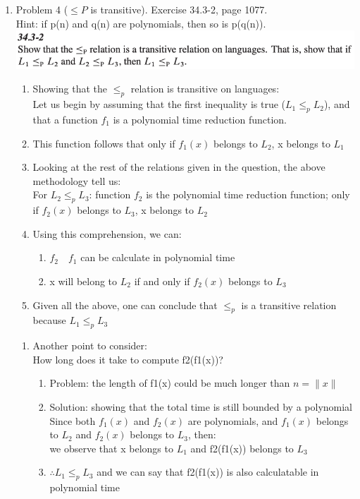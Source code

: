 \documentclass[11pt]{article}
\newcommand{\circo}{~\raisebox{1pt}{\tikz \draw[line width=0.6pt] circle(1.1pt);}~}
\begin{document}
\begin{enumerate}
\item Problem 4 ($\leq P$ is transitive). Exercise 34.3-2, page 1077. \\Hint: if p(n) and q(n) are polynomials, then so is p(q(n)).\\
\includegraphics[scale=1]{HW5_Q4.png}
    \begin{enumerate}
        \item Showing that the $\leq_p$ relation is transitive on languages:\\
        Let us begin by assuming that the first inequality is true ($L_1 \leq_p L_2$), and that a function $f_1$ is a polynomial time reduction function.
        \item This function follows that only if $f_1(x)$ belongs to $L_2$,  x belongs to $L_1$
        \item Looking at the rest of the relations given in the question, the above methodology tell us:\\
        For $L_2 \leq_p L_3$: function $f_2$ is the polynomial time reduction function; only if $f_2(x)$ belongs to $L_3$,  x belongs to $L_2$
        \item Using this comprehension, we can:
            \begin{enumerate}
                \item $f_2$\circo $f_1$  can be calculate in polynomial time
                \item x will belong to $L_2$ if and only if $f_2(x)$ belongs to $L_3$
            \end{enumerate}
        \item Given all the above, one can conclude that $\leq_p$ is a transitive relation because $L_1 \leq_p L_3$\\
    \end{enumerate}
    \begin{enumerate}
        \item Another point to consider:\\
        How long does it take to compute f2(f1(x))?
        \begin{enumerate}
            \item Problem: the length of f1(x) could be much longer than $n=\|x\|$
            \item Solution: showing that the total time is still bounded by a polynomial\\
            Since both $f_1(x)$ and $f_2(x)$ are polynomials, and $f_1(x)$ belongs to $L_2$ and $f_2(x)$ belongs to $L_3$, then:\\
            we observe that x belongs to $L_1$ and f2(f1(x)) belongs to $L_3$
            \item $\therefore L_1 \leq_p L_3$ and we can say that f2(f1(x)) is also calculatable in polynomial time
            

\end{enumerate}
\end{enumerate}
\end{enumerate}
\end{document}
